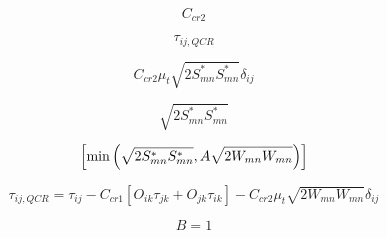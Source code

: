 \begin{equation}
C_{cr2}
\end{equation}

\begin{equation}
\tau_{ij,QCR}
\end{equation}

\begin{equation}
C_{cr2} \mu_t \sqrt{2 S^*_{mn}S^*_{mn}}\delta_{ij}
\end{equation}

\begin{equation}
\sqrt{2 S^*_{mn}S^*_{mn}}
\end{equation}

\begin{equation}
\left[{\rm min}\left(\sqrt{2 S^*_{mn}S^*_{mn}},A\sqrt{2 W_{mn}W_{mn}}\right)\right]
\end{equation}

\begin{equation}
\tau_{ij,QCR} = \tau_{ij} - C_{cr1} \left[ O_{ik} \tau_{jk} + O_{jk} \tau_{ik} \right]
- C_{cr2} \mu_t \sqrt{2 W_{mn}W_{mn}}\delta_{ij}
\end{equation}

\begin{equation}
B=1
\end{equation}


